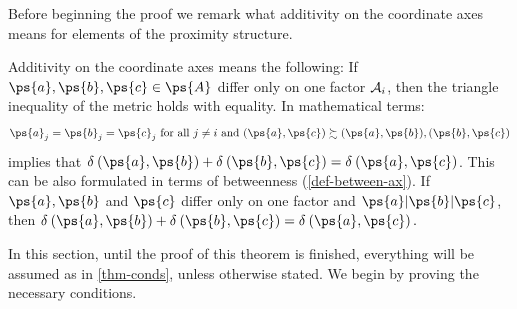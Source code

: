 Before beginning the proof we remark what additivity on the coordinate axes means for elements of the proximity structure.

\begin{rem} %
	Additivity on the coordinate axes means the following: If $\ps{a}, \ps{b}, \ps{c} \in \ps{A}$ differ only on one factor $\mathcal{A}_i$, then the triangle inequality of the metric holds with equality. In mathematical terms:
	$$ \ps{a}_j = \ps{b}_j = \ps{c}_j \text{ for all } j \neq i \text{ and } (\ps{a}, \ps{c}) \succsim (\ps{a}, \ps{b}), (\ps{b}, \ps{c})$$
	implies that $\metr{\ps{a}}{\ps{b}} + \metr{\ps{b}}{\ps{c}} = \metr{\ps{a}}{\ps{c}}$.
  This can be also formulated in terms of betweenness (\cref{def-between-ax}). If $\ps{a}, \ps{b}$ and $\ps{c}$ differ only on one factor and $\ps{a}|\ps{b}|\ps{c}$, then $\metr{\ps{a}}{\ps{b}} + \metr{\ps{b}}{\ps{c}} = \metr{\ps{a}}{\ps{c}}.$ 
\end{rem}

In this section, until the proof of this theorem is finished, everything will be assumed as in \cref{thm-conds}, unless otherwise stated.
We begin by proving the necessary conditions.

